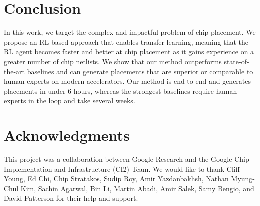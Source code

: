 \documentclass{article}
\begin{document}
\section{Conclusion}
In this work, we target the complex and impactful problem of chip placement. We propose an RL-based approach that enables transfer learning, meaning that the RL agent becomes faster and better at chip placement as it gains experience on a greater number of chip netlists. We show that our method outperforms state-of-the-art baselines and can generate placements that are superior or comparable to human experts on modern accelerators. Our method is end-to-end and generates placements in under 6 hours, whereas the strongest baselines require human experts in the loop and take several weeks.

\section{Acknowledgments}
This project was a collaboration between Google Research and the Google Chip Implementation and Infrastructure (CI2) Team. We would like to thank Cliff Young, Ed Chi, Chip Stratakos, Sudip Roy, Amir Yazdanbakhsh, Nathan Myung-Chul Kim, Sachin Agarwal, Bin Li, Martin Abadi, Amir Salek, Samy Bengio, and David Patterson for their help and support. 



\end{document}
